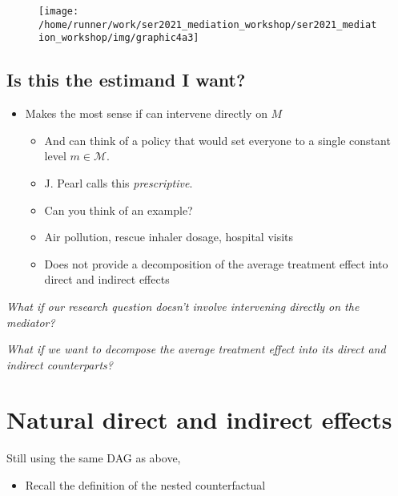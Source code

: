 \documentclass[
  12pt,
]{book}
\providecommand{\tightlist}{%
  \setlength{\itemsep}{0pt}\setlength{\parskip}{0pt}}
\theoremstyle{definition}
\theoremstyle{definition}
\theoremstyle{definition}
\newcommand{\1}{\mathbbm{1}}
\begin{document}
\begin{figure}

{\centering \texttt{[image: /home/runner/work/ser2021\_mediation\_workshop/ser2021\_mediation\_workshop/img/graphic4a3]} 

}

\end{figure}

\hypertarget{is-this-the-estimand-i-want}{%
\subsection{Is this the estimand I want?}\label{is-this-the-estimand-i-want}}

\begin{itemize}
\tightlist
\item
  Makes the most sense if can intervene directly on \(M\)

  \begin{itemize}
  \tightlist
  \item
    And can think of a policy that would set everyone to a single constant
    level \(m \in \mathcal{M}\).
  \item
    J. Pearl calls this \emph{prescriptive}.
  \item
    Can you think of an example?
  \item
    Air pollution, rescue inhaler dosage, hospital visits
  \item
    Does not provide a decomposition of the average treatment effect into direct and indirect effects
  \end{itemize}
\end{itemize}

\emph{What if our research question doesn't involve intervening directly on the
mediator?}

\emph{What if we want to decompose the average treatment effect into its direct and
indirect counterparts?}

\hypertarget{natural-direct-and-indirect-effects}{%
\section{Natural direct and indirect effects}\label{natural-direct-and-indirect-effects}}

Still using the same DAG as above,

\begin{itemize}
\tightlist
\item
  Recall the definition of the nested counterfactual
\end{itemize}
\end{document}
